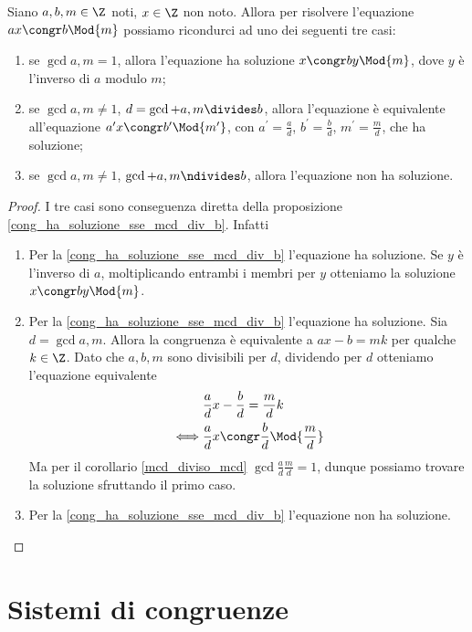 \begin{proposition}
    Siano $a, b, m \in \Z$ noti, $x \in \Z$ non noto. Allora per risolvere l'equazione $ax \congr b \Mod{m}$ possiamo ricondurci ad uno dei seguenti tre casi:
    \begin{enumerate}
        \item se $\gcd{a, m} = 1$, allora l'equazione ha soluzione $x \congr by \Mod{m}$, dove $y$ è l'inverso di $a$ modulo $m$;
        \item se $\gcd{a, m} \neq 1$, $d = \gcd{a, m} \divides b$, allora l'equazione è equivalente all'equazione $a^\prime x \congr b^\prime \Mod{m^\prime}$, con $a^\prime = \frac{a}{d}$, $b^\prime = \frac{b}{d}$, $m^\prime = \frac{m}{d}$, che ha soluzione;
        \item se $\gcd{a, m} \neq 1$, $\gcd{a, m} \ndivides b$, allora l'equazione non ha soluzione.
    \end{enumerate}
\end{proposition}
\begin{proof}
    I tre casi sono conseguenza diretta della proposizione \ref{cong_ha_soluzione_sse_mcd_div_b}. Infatti
    \begin{enumerate}
        \item Per la \ref{cong_ha_soluzione_sse_mcd_div_b} l'equazione ha soluzione. Se $y$ è l'inverso di $a$, moltiplicando entrambi i membri per $y$ otteniamo la soluzione $x \congr by \Mod{m}$.
        \item Per la \ref{cong_ha_soluzione_sse_mcd_div_b} l'equazione ha soluzione. 
        Sia $d = \gcd{a, m}$. Allora la congruenza è equivalente a $ax - b = mk$ per qualche $k \in \Z$. Dato che $a, b, m$ sono divisibili per $d$, dividendo per $d$ otteniamo l'equazione equivalente
        \begin{alignat*}
            {1}
            &\frac{a}{d}x - \frac{b}{d} = \frac{m}{d}k \\
            \iff &\frac{a}{d}x \congr \frac{b}{d} \Mod{\frac{m}{d}}
        \end{alignat*}
        Ma per il corollario \ref{mcd_diviso_mcd} $\gcd{\frac{a}{d}}{\frac{m}{d}} = 1$, dunque possiamo trovare la soluzione sfruttando il primo caso.
        \item Per la \ref{cong_ha_soluzione_sse_mcd_div_b} l'equazione non ha soluzione. \qedhere
    \end{enumerate}
\end{proof}

\section{Sistemi di congruenze}

